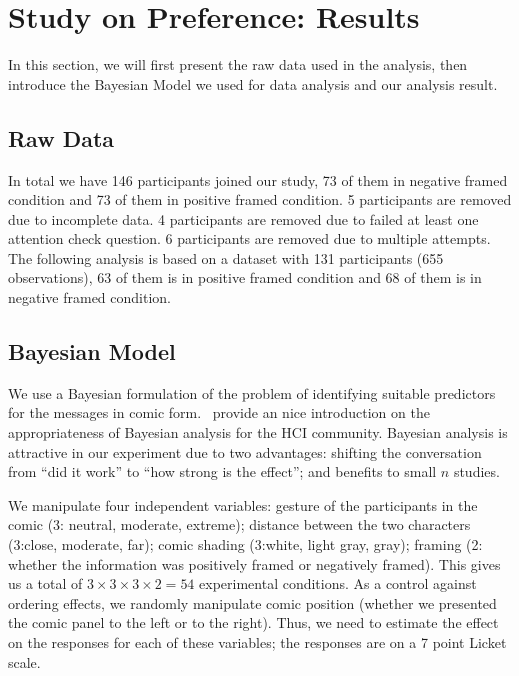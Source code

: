 
\section{Study on Preference: Results}
\label{sec:Results}
In this section, we will first present the raw data used in the analysis, then introduce the Bayesian Model we used for data analysis and our analysis result.

\subsection{Raw Data}
\label{sub:Raw Data}
In total we have 146 participants joined our study, 73 of them in negative framed condition and 73 of them in positive framed condition. 5 participants are removed due to incomplete data. 4 participants are removed due to failed at least one attention check question. 6 participants are removed due to multiple attempts. The following analysis is based on a dataset with 131 participants (655 observations), 63 of them is in positive framed condition and 68 of them is in negative framed condition.

\subsection{Bayesian Model}
\label{sub:Bayesian Model}
We use a Bayesian formulation of the problem of identifying suitable predictors for the messages in comic form.~\textcite{Kay2016} provide an nice introduction on the appropriateness of Bayesian analysis for the HCI community. Bayesian analysis is attractive in our experiment due to two advantages: shifting the conversation from ``did it work'' to ``how strong is the effect''; and benefits to small $n$ studies. 

We manipulate four independent variables: gesture of the participants in the comic (3: neutral, moderate, extreme);  distance between the two characters (3:close, moderate, far); comic shading (3:white, light gray, gray); framing (2: whether the information was positively framed or negatively framed).  This gives us a total of $3 \times 3 \times 3 \times 2= 54$ experimental conditions. As a control against ordering effects, we randomly manipulate comic position (whether we presented the comic panel to the left or to the right).  Thus, we need to estimate the effect on the responses for each of these variables; the responses are on a 7 point Licket scale.

